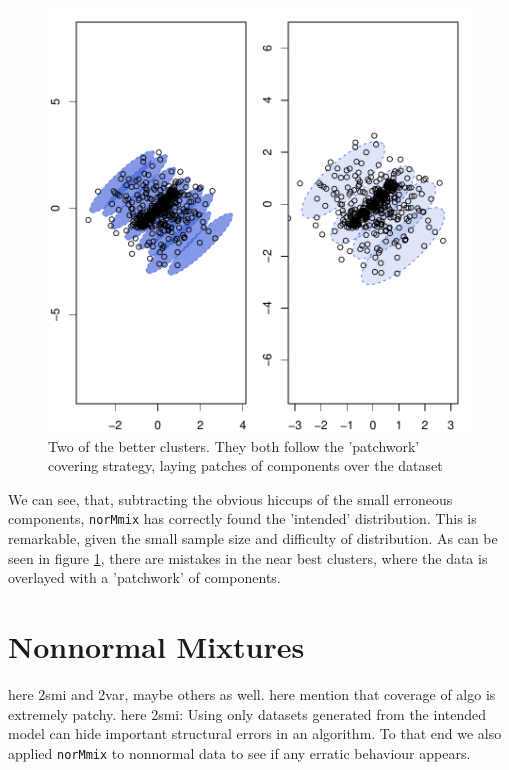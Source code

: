 \begin{figure}[h]
    \begin{Rgraph}[0.9]
\includegraphics{chapter3-fig214fit2}
    \end{Rgraph}
    \caption{Two of the better clusters. They both follow the 'patchwork'
             covering strategy, laying patches of components over the dataset}
    \label{fig:214fit2}
\end{figure}

We can see, that, subtracting the obvious hiccups of the small erroneous
components, {\tt norMmix} has correctly found the 'intended' 
distribution. This is remarkable, given the small sample size and difficulty of 
distribution. As can be seen in figure \ref{fig:214fit2}, there are mistakes in
the near best clusters, where the data is overlayed with a 'patchwork' of 
components.

\clearpage

\section{Nonnormal Mixtures}

here 2smi and 2var, maybe others as well.
here mention that coverage of algo is extremely patchy.
here 2smi:
Using only datasets generated from the intended model can hide important 
structural errors in an algorithm. To that end we also applied {\tt norMmix}
to nonnormal data to see if any erratic behaviour appears.

